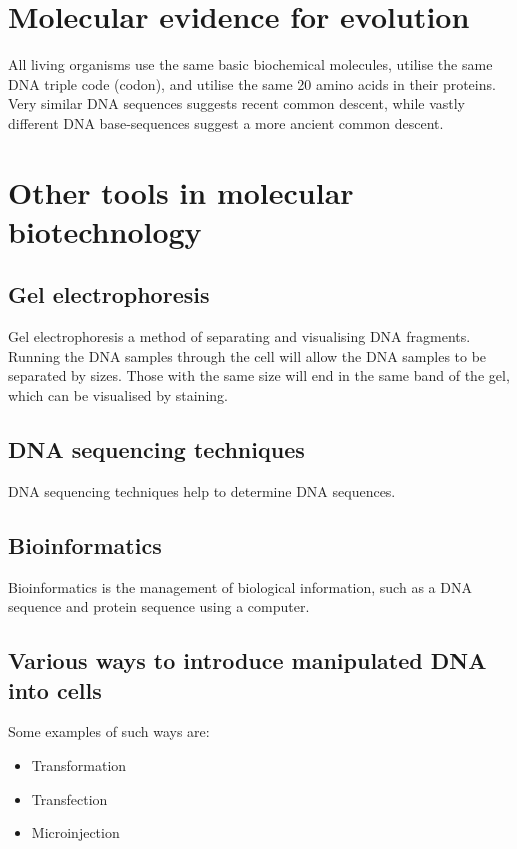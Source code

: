 \documentclass[11pt]{article}
\begin{document}
\section{Molecular evidence for evolution}
\label{sec:org174872e}
All living organisms use the same basic biochemical molecules, utilise the same DNA triple code (codon), and utilise the same 20 amino acids in their proteins.
\\[0pt]

Very similar DNA sequences suggests recent common descent, while vastly different DNA base-sequences suggest a more ancient common descent.


\section{Other tools in molecular biotechnology}
\label{sec:orgf4bc0a5}

\subsection{Gel electrophoresis}
\label{sec:org79e660b}
Gel electrophoresis a method of separating and visualising DNA fragments. Running the DNA samples through the cell will allow the DNA samples to be separated by sizes. Those with the same size will end in the same band of the gel, which can be visualised by staining.

\subsection{DNA sequencing techniques}
\label{sec:orgaa07f24}
DNA sequencing techniques help to determine DNA sequences.

\subsection{Bioinformatics}
\label{sec:orgcbfb28b}
Bioinformatics is the management of biological information, such as a DNA sequence and protein sequence using a computer.

\subsection{Various ways to introduce manipulated DNA into cells}
\label{sec:orgb948fb8}
Some examples of such ways are:
\begin{itemize}
\item Transformation
\item Transfection
\item Microinjection
\end{itemize}
\end{document}
